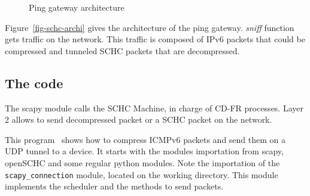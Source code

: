 \begin{figure}[!ht] 
\centering 



\caption{Ping gateway architecture} 
\label{fig-schc-archi} 
\end{figure} 

Figure~\vref{fig-schc-archi} gives the architecture of the ping gateway. 
 \textit{sniff} function gets traffic on the network. 
This traffic is composed of IPv6 packets that could be compressed and tunneled SCHC packets that are decompressed. 



\subsection{The code}
\label{sec-compr-code}

The scapy module calls the SCHC Machine, in charge of CD-FR processes. Layer 2 allows to send decompressed packet or a SCHC packet on the network. 





This program~ shows how to compress ICMPv6 packets and send them on a UDP tunnel to a device. It starts with the modules importation from scapy, openSCHC and some regular python modules. Note the importation of the \texttt{scapy\_connection} module, located on the working directory. This module implements the scheduler and the methods to send packets.

